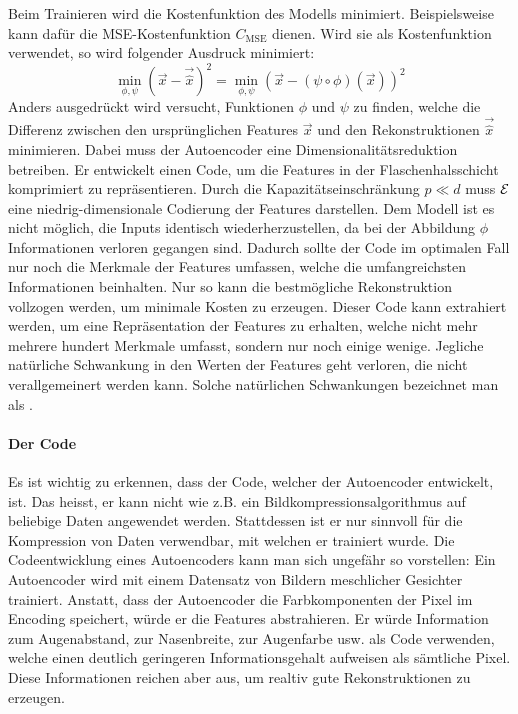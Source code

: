 Beim Trainieren wird die Kostenfunktion des Modells minimiert.
Beispielsweise kann dafür die MSE-Kostenfunktion $C_{\text{MSE}}$ dienen.
Wird sie als Kostenfunktion verwendet, so wird folgender Ausdruck minimiert:
\begin{equation}
  \min_{\phi,\psi} {(\vec{x} - \vec{\hat{x}})}^2 = \min_{\phi,\psi} {(\vec{x} - (\psi \circ \phi)(\vec{x}))}^2
\end{equation}
Anders ausgedrückt wird versucht, Funktionen $\phi$ und $\psi$ zu finden, welche
die Differenz zwischen den ursprünglichen Features $\vec{x}$ und den Rekonstruktionen
$\vec{\hat{x}}$ minimieren. Dabei muss der Autoencoder
eine Dimensionalitätsreduktion betreiben. Er entwickelt einen Code, um die Features
in der Flaschenhalsschicht komprimiert zu repräsentieren. Durch die
Kapazitätseinschränkung $p \ll d$ muss $\mathcal{E}$ eine niedrig-dimensionale
Codierung der Features darstellen. Dem Modell ist es nicht möglich, die Inputs
identisch wiederherzustellen, da bei der Abbildung $\phi$ Informationen verloren
gegangen sind. Dadurch sollte der Code im optimalen Fall nur noch die Merkmale
der Features umfassen, welche die umfangreichsten Informationen beinhalten.
Nur so kann die bestmögliche Rekonstruktion vollzogen werden, um minimale Kosten
zu erzeugen.
Dieser Code kann extrahiert werden, um eine Repräsentation der Features zu
erhalten, welche nicht mehr mehrere hundert Merkmale umfasst, sondern nur noch einige
wenige. Jegliche natürliche Schwankung in den Werten der Features geht
verloren, die nicht verallgemeinert werden kann. Solche natürlichen Schwankungen
bezeichnet man als .

\paragraph{Der Code}
Es ist wichtig zu erkennen, dass der Code, welcher der Autoencoder entwickelt,
 ist. Das heisst, er kann nicht wie z.B. ein
Bildkompressionsalgorithmus auf beliebige Daten angewendet werden. Stattdessen
ist er nur sinnvoll für die Kompression von Daten verwendbar, mit welchen er trainiert
wurde.
\para{}
Die Codeentwicklung eines Autoencoders kann man sich ungefähr so vorstellen:
Ein Autoencoder wird mit einem Datensatz von Bildern meschlicher Gesichter trainiert.
Anstatt, dass der Autoencoder die Farbkomponenten der Pixel im Encoding speichert, würde er
die Features abstrahieren. Er würde Information zum Augenabstand, zur
Nasenbreite, zur Augenfarbe usw. als Code verwenden, welche einen deutlich geringeren
Informationsgehalt aufweisen als sämtliche Pixel. Diese Informationen reichen
aber aus, um realtiv gute Rekonstruktionen zu erzeugen.

